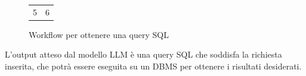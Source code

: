 \begin{figure}[H]
\begin{tabular}{cc}
    5 & 6 \\[6pt]
  \end{tabular}
  \caption{Workflow per ottenere una query SQL}
\end{figure}
\par L'output atteso dal modello LLM è una query SQL che soddisfa la richiesta inserita, che potrà essere eseguita su un DBMS per ottenere i risultati desiderati.